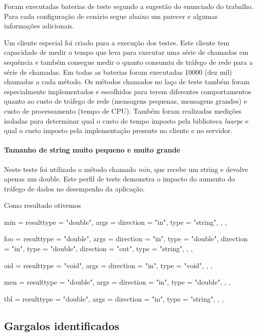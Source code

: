 \documentclass[11pt]{article}
\begin{document}
Foram executadas baterias de teste segundo a sugestão do enunciado do trabalho.
Para cada configuração de cenário segue abaixo um parecer e algumas informações
adicionais.

Um cliente especial foi criado para a execução dos testes. Este cliente tem
capacidade de medir o tempo que leva para executar uma série de chamadas em
sequência e também consegue medir o quanto consumiu de tráfego de rede para a
série de chamadas. Em todas as baterias foram executadas 10000 (dez mil)
chamadas a cada método. Os métodos chamados no laço de teste também foram
especialmente implementados e escolhidos para terem diferentes comportamentos
quanto ao custo de tráfego de rede (mensagens pequenas, mensagens grandes) e
custo de processamento (tempo de CPU). Também foram realizadas medições isoladas
para determinar qual o custo de tempo imposto pela biblioteca \textit{luarpc} e
qual o custo imposto pela implementação presente no cliente e no servidor.

\paragraph{Tamanho de string muito pequeno e muito grande}

Neste teste foi utilizado o método chamado \textit{min}, que recebe um string e
devolve apenas um double. Este perfil de teste demonstra o impacto do aumento
do tráfego de dados no desempenho da aplicação.

Como resultado otivemos 

    min = {
      resulttype = "double",
      args = {
        {direction = "in", type = "string"},
      },
    },

    foo = {
      resulttype = "double",
      args = {
        {direction = "in", type = "double"},
        {direction = "in", type = "double"},
        {direction = "out", type = "string"},
      },
    },

    oid = {
      resulttype = "void",
      args = {
        {direction = "in", type = "void"},
      },
    },


    men = {
      resulttype = "double",
      args = {
        {direction = "in", type = "double"},
      },
    },

    tbl = {
      resulttype = "double",
      args = {
        {direction = "in", type = "string"},
      },
    },

\subsection{Gargalos identificados}\label{subsec:bottle}
\end{document}
